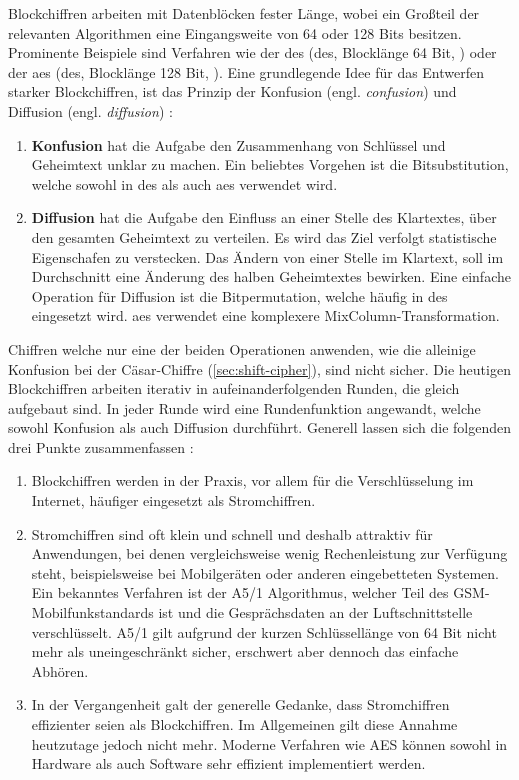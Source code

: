 \noindent
Blockchiffren arbeiten mit Datenblöcken fester Länge, wobei ein Großteil der
relevanten Algorithmen eine Eingangsweite von 64 oder 128 Bits besitzen.
Prominente Beispiele sind Verfahren wie der \acl{des}
(\acs{des}, Blocklänge 64 Bit, \cite[55-58]{BOOK:crypto}) oder der \acl{aes}
(\acs{des}, Blocklänge 128 Bit, \cite[87-90]{BOOK:crypto}).
Eine grundlegende Idee für das Entwerfen starker Blockchiffren, ist das Prinzip
der Konfusion (engl. \textit{confusion}) und
Diffusion (engl. \textit{diffusion}) \parencite[57]{BOOK:crypto}:
\begin{enumerate}[itemsep = 0pt]
  \item \textbf{Konfusion} hat die Aufgabe den
        Zusammenhang von Schlüssel und Geheimtext unklar zu machen. Ein
        beliebtes Vorgehen ist die Bitsubstitution, welche sowohl in \acs{des} als auch
        \acs{aes} verwendet wird.
  \item \textbf{Diffusion} hat die Aufgabe den Einfluss
        an einer Stelle des Klartextes, über den gesamten Geheimtext zu verteilen. Es wird
        das Ziel verfolgt
        statistische Eigenschafen zu verstecken. Das Ändern von einer Stelle im Klartext,
        soll im Durchschnitt eine Änderung des halben Geheimtextes bewirken. Eine einfache
        Operation für Diffusion ist die Bitpermutation, welche häufig in \acs{des} eingesetzt wird.
        \acs{aes} verwendet eine komplexere MixColumn-Transformation.
\end{enumerate}
Chiffren welche nur eine der beiden Operationen anwenden, wie die alleinige Konfusion bei der
Cäsar-Chiffre (\autoref{sec:shift-cipher}), sind nicht sicher. Die heutigen Blockchiffren
arbeiten iterativ in aufeinanderfolgenden Runden, die gleich aufgebaut sind. In jeder Runde wird eine
Rundenfunktion angewandt, welche sowohl Konfusion als auch Diffusion durchführt.
Generell lassen sich die folgenden drei Punkte zusammenfassen \parencite[31]{BOOK:crypto}:

\begin{enumerate}[itemsep = 0pt]
  \item Blockchiffren werden in der Praxis, vor allem für die Verschlüsselung im Internet,
        häufiger eingesetzt als Stromchiffren.
  \item Stromchiffren sind oft klein und schnell und deshalb attraktiv für Anwendungen,
        bei denen vergleichsweise wenig Rechenleistung zur Verfügung steht, beispielsweise bei
        Mobilgeräten oder anderen eingebetteten Systemen. Ein bekanntes Verfahren ist der
        A5/1 Algorithmus, welcher Teil des GSM-Mobilfunkstandards ist und die Gesprächsdaten
        an der Luftschnittstelle verschlüsselt. A5/1 gilt aufgrund der kurzen Schlüssellänge von
        64 Bit nicht mehr als uneingeschränkt sicher, erschwert aber dennoch das einfache Abhören.
  \item In der Vergangenheit galt der generelle Gedanke, dass Stromchiffren
        effizienter seien als Blockchiffren.
        Im Allgemeinen gilt diese Annahme heutzutage jedoch nicht mehr. Moderne Verfahren wie AES
        können sowohl in Hardware als auch Software sehr effizient implementiert werden.
\end{enumerate}

